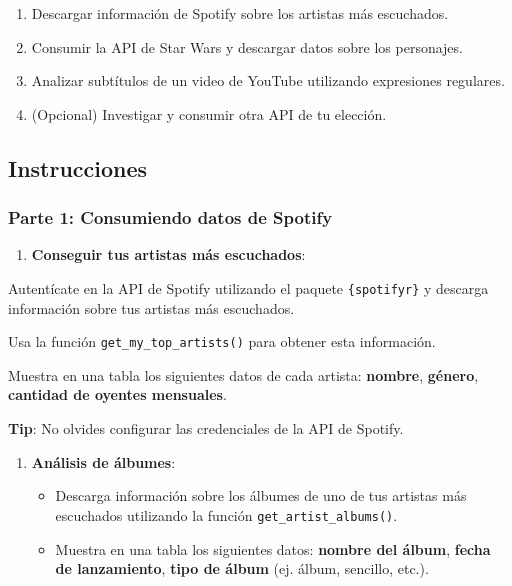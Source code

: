 \documentclass[
  letterpaper,
  DIV=11,
  numbers=noendperiod]{scrreprt}
\providecommand{\tightlist}{%
  \setlength{\itemsep}{0pt}\setlength{\parskip}{0pt}}
\begin{document}
\begin{enumerate}
\def\labelenumi{\arabic{enumi}.}
\item
  Descargar información de Spotify sobre los artistas más escuchados.
\item
  Consumir la API de Star Wars y descargar datos sobre los personajes.
\item
  Analizar subtítulos de un video de YouTube utilizando expresiones
  regulares.
\item
  (Opcional) Investigar y consumir otra API de tu elección.
\end{enumerate}

\subsection{Instrucciones}\label{instrucciones}

\subsubsection{Parte 1: Consumiendo datos de
Spotify}\label{parte-1-consumiendo-datos-de-spotify}

\begin{enumerate}
\def\labelenumi{\arabic{enumi}.}
\tightlist
\item
  \textbf{Conseguir tus artistas más escuchados}:
\end{enumerate}

Autentícate en la API de Spotify utilizando el paquete
\texttt{\{spotifyr\}} y descarga información sobre tus artistas más
escuchados.

Usa la función \texttt{get\_my\_top\_artists()} para obtener esta
información.

Muestra en una tabla los siguientes datos de cada artista:
\textbf{nombre}, \textbf{género}, \textbf{cantidad de oyentes
mensuales}.

\textbf{Tip}: No olvides configurar las credenciales de la API de
Spotify.

\begin{enumerate}
\def\labelenumi{\arabic{enumi}.}
\setcounter{enumi}{1}
\item
  \textbf{Análisis de álbumes}:

  \begin{itemize}
  \item
    Descarga información sobre los álbumes de uno de tus artistas más
    escuchados utilizando la función \texttt{get\_artist\_albums()}.
  \item
    Muestra en una tabla los siguientes datos: \textbf{nombre del
    álbum}, \textbf{fecha de lanzamiento}, \textbf{tipo de álbum} (ej.
    álbum, sencillo, etc.).
  \end{itemize}
\end{enumerate}
\end{document}
